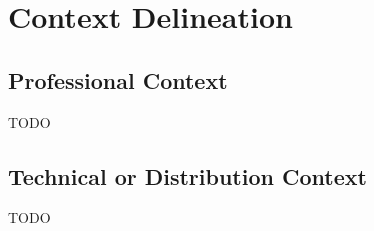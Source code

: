 \section{Context Delineation}

\subsection{Professional Context}
TODO
\subsection{Technical or Distribution Context}
TODO